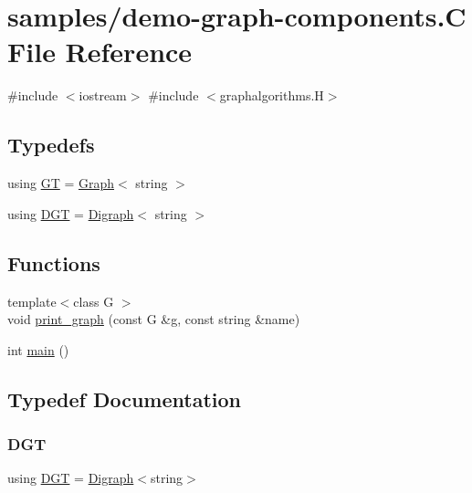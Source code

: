 \hypertarget{demo-graph-components_8_c}{}\section{samples/demo-\/graph-\/components.C File Reference}
\label{demo-graph-components_8_c}
{\ttfamily \#include $<$iostream$>$}\newline
{\ttfamily \#include $<$graphalgorithms.\+H$>$}\newline
\subsection*{Typedefs}
\begin{DoxyCompactItemize}
\item 
using \hyperlink{demo-graph-components_8_c_a668102de43ec3f9488fff7b515d48859}{GT} = \hyperlink{class_designar_1_1_graph}{Graph}$<$ string $>$
\item 
using \hyperlink{demo-graph-components_8_c_a8f123599e859454680bf37e203c0b18b}{D\+GT} = \hyperlink{class_designar_1_1_digraph}{Digraph}$<$ string $>$
\end{DoxyCompactItemize}
\subsection*{Functions}
\begin{DoxyCompactItemize}
\item 
{\footnotesize template$<$class G $>$ }\\void \hyperlink{demo-graph-components_8_c_af4aa6ad85cbef3cd03726e2b31004df6}{print\+\_\+graph} (const G \&g, const string \&name)
\item 
int \hyperlink{demo-graph-components_8_c_ae66f6b31b5ad750f1fe042a706a4e3d4}{main} ()
\end{DoxyCompactItemize}


\subsection{Typedef Documentation}
\mbox{\label{demo-graph-components_8_c_a8f123599e859454680bf37e203c0b18b}} 
\subsubsection{\texorpdfstring{D\+GT}{DGT}}
{\footnotesize\ttfamily using \hyperlink{demo-buildgraph_8_c_ae73e956c2a8cf0a58255aa6b659985e0}{D\+GT} =  \hyperlink{class_designar_1_1_digraph}{Digraph}$<$string$>$}



